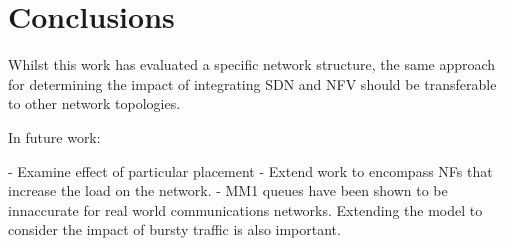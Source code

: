 
\section{Conclusions}
\label{sec:conclusions}

Whilst this work has evaluated a specific network structure, the same approach for determining the impact of integrating SDN and NFV should be transferable to other network topologies. 

In future work:

- Examine effect of particular placement
- Extend work to encompass NFs that increase the load on the network.
- MM1 queues have been shown to be innaccurate for real world communications networks. Extending the model to consider the impact of bursty traffic is also important.